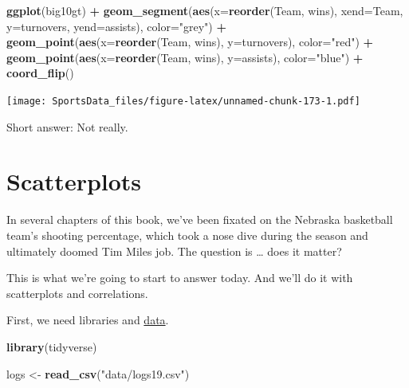 \documentclass[]{book}
\newenvironment{Shaded}{\begin{snugshade}}{\end{snugshade}}
\newcommand{\KeywordTok}[1]{\textcolor[rgb]{0.13,0.29,0.53}{\textbf{#1}}}
\newcommand{\DataTypeTok}[1]{\textcolor[rgb]{0.13,0.29,0.53}{#1}}
\newcommand{\StringTok}[1]{\textcolor[rgb]{0.31,0.60,0.02}{#1}}
\newcommand{\OperatorTok}[1]{\textcolor[rgb]{0.81,0.36,0.00}{\textbf{#1}}}
\newcommand{\NormalTok}[1]{#1}
\begin{document}
\begin{Shaded}
\begin{Highlighting}[]
\KeywordTok{ggplot}\NormalTok{(big10gt) }\OperatorTok{+}
\StringTok{  }\KeywordTok{geom_segment}\NormalTok{(}\KeywordTok{aes}\NormalTok{(}\DataTypeTok{x=}\KeywordTok{reorder}\NormalTok{(Team, wins), }\DataTypeTok{xend=}\NormalTok{Team, }\DataTypeTok{y=}\NormalTok{turnovers, }\DataTypeTok{yend=}\NormalTok{assists), }\DataTypeTok{color=}\StringTok{"grey"}\NormalTok{) }\OperatorTok{+}\StringTok{ }
\StringTok{  }\KeywordTok{geom_point}\NormalTok{(}\KeywordTok{aes}\NormalTok{(}\DataTypeTok{x=}\KeywordTok{reorder}\NormalTok{(Team, wins), }\DataTypeTok{y=}\NormalTok{turnovers), }\DataTypeTok{color=}\StringTok{"red"}\NormalTok{) }\OperatorTok{+}\StringTok{ }
\StringTok{  }\KeywordTok{geom_point}\NormalTok{(}\KeywordTok{aes}\NormalTok{(}\DataTypeTok{x=}\KeywordTok{reorder}\NormalTok{(Team, wins), }\DataTypeTok{y=}\NormalTok{assists), }\DataTypeTok{color=}\StringTok{"blue"}\NormalTok{) }\OperatorTok{+}
\StringTok{  }\KeywordTok{coord_flip}\NormalTok{()}
\end{Highlighting}
\end{Shaded}

\texttt{[image: SportsData\_files/figure-latex/unnamed-chunk-173-1.pdf]}

Short answer: Not really.

\chapter{Scatterplots}\label{scatterplots}

In several chapters of this book, we've been fixated on the Nebraska
basketball team's shooting percentage, which took a nose dive during the
season and ultimately doomed Tim Miles job. The question is \ldots{}
does it matter?

This is what we're going to start to answer today. And we'll do it with
scatterplots and correlations.

First, we need libraries and
\href{https://unl.box.com/s/a8m91bro10t89watsyo13yjegb1fy009}{data}.

\begin{Shaded}
\begin{Highlighting}[]
\KeywordTok{library}\NormalTok{(tidyverse)}
\end{Highlighting}
\end{Shaded}

\begin{Shaded}
\begin{Highlighting}[]
\NormalTok{logs <-}\StringTok{ }\KeywordTok{read_csv}\NormalTok{(}\StringTok{"data/logs19.csv"}\NormalTok{)}
\end{Highlighting}
\end{Shaded}
\end{document}
